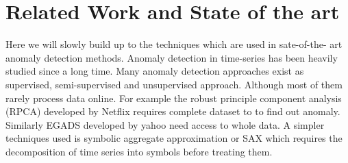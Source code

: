\documentclass[12pt]{article}
\begin{document}
\section{Related Work and State of the art}
Here we will slowly build up to the techniques which are used in sate-of-the-
art anomaly detection methods. Anomaly detection in time-series has been heavily studied since a long time. Many anomaly detection approaches exist as supervised, semi-supervised and unsupervised approach. Although most of them rarely process data online. For example the robust principle component analysis (RPCA) developed by Netflix requires complete dataset to to find out anomaly. Similarly EGADS developed by yahoo need access to whole data. A simpler techniques used is symbolic aggregate approximation or SAX which requires the decomposition of time series into symbols before treating them. \\
\break
\end{document}
